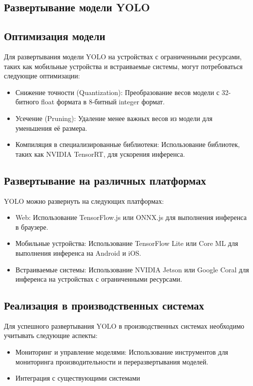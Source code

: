     \subsection{Развертывание модели YOLO}

    \subsection{Оптимизация модели}
    Для развертывания модели YOLO на устройствах с ограниченными ресурсами, таких как мобильные устройства и встраиваемые системы, могут потребоваться следующие оптимизации:
    \begin{itemize}
        \item Снижение точности (Quantization): Преобразование весов модели с 32-битного float формата в 8-битный integer формат.
        \item Усечение (Pruning): Удаление менее важных весов из модели для уменьшения её размера.
        \item Компиляция в специализированные библиотеки: Использование библиотек, таких как NVIDIA TensorRT, для ускорения инференса.
    \end{itemize}

    \subsection{Развертывание на различных платформах}
    YOLO можно развернуть на следующих платформах:
    \begin{itemize}
        \item Web: Использование TensorFlow.js или ONNX.js для выполнения инференса в браузере.
        \item Мобильные устройства: Использование TensorFlow Lite или Core ML для выполнения инференса на Android и iOS.
        \item Встраиваемые системы: Использование NVIDIA Jetson или Google Coral для инференса на устройствах с ограниченными ресурсами.
    \end{itemize}

    \subsection{Реализация в производственных системах}
    Для успешного развертывания YOLO в производственных системах необходимо учитывать следующие аспекты:
    \begin{itemize}
        \item Мониторинг и управление моделями: Использование инструментов для мониторинга производительности и переразвертывания моделей.
        \item Интеграция с существующими системами
    \end{itemize}

